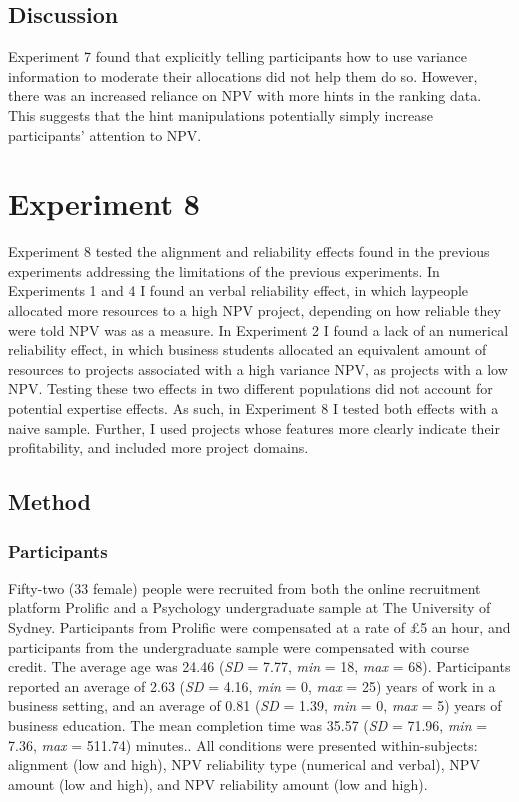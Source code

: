 \documentclass[a4paper, nobind, dvipsnames]{templates/ociamthesis}
\theoremstyle{definition}
\theoremstyle{definition}
\theoremstyle{definition}
\theoremstyle{definition}
\theoremstyle{remark}
\begin{document}
\hypertarget{discussion-12}{%
\subsection{Discussion}\label{discussion-12}}

Experiment 7 found that explicitly telling participants how to use variance
information to moderate their allocations did not help them do so. However,
there was an increased reliance on NPV with more hints in the ranking data. This
suggests that the hint manipulations potentially simply increase participants'
attention to NPV.

\hypertarget{alignment-7}{%
\section{Experiment 8}\label{alignment-7}}

Experiment 8 tested the alignment and reliability effects found in the previous
experiments addressing the limitations of the previous experiments. In
Experiments 1 and 4 I found an verbal reliability effect, in which laypeople
allocated more resources to a high NPV project, depending on how reliable they
were told NPV was as a measure. In Experiment 2 I found a lack of an numerical
reliability effect, in which business students allocated an equivalent amount of
resources to projects associated with a high variance NPV, as projects with a
low NPV. Testing these two effects in two different populations did not account
for potential expertise effects. As such, in Experiment 8 I tested both effects
with a naive sample. Further, I used projects whose features more clearly
indicate their profitability, and included more project domains.

\hypertarget{method-16}{%
\subsection{Method}\label{method-16}}

\hypertarget{participants-14}{%
\subsubsection{Participants}\label{participants-14}}

Fifty-two (33 female) people were recruited from both the online recruitment platform Prolific and a Psychology undergraduate sample at The University of Sydney. Participants from Prolific were compensated at a rate of £5 an hour, and participants from the undergraduate sample were compensated with course credit. The average age was 24.46 (\emph{SD} = 7.77, \emph{min} = 18, \emph{max} = 68). Participants reported an average of 2.63 (\emph{SD} = 4.16, \emph{min} = 0, \emph{max} = 25) years of work in a business setting, and an average of 0.81 (\emph{SD} = 1.39, \emph{min} = 0, \emph{max} = 5) years of business education. The mean completion time was 35.57 (\emph{SD} = 71.96, \emph{min} = 7.36, \emph{max} = 511.74) minutes.. All conditions were presented within-subjects:
alignment (low and high), NPV reliability type (numerical and verbal), NPV
amount (low and high), and NPV reliability amount (low and high).
\end{document}
